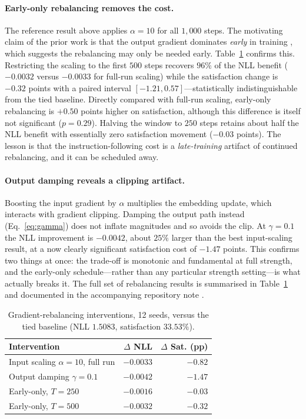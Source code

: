 \documentclass[conference]{IEEEtran}
\begin{document}
\paragraph{Early-only rebalancing removes the cost.}
The reference result above applies $\alpha=10$ for all $1{,}000$ steps. The
motivating claim of the prior work is that the output gradient dominates
\emph{early} in training \cite{lopardo}, which suggests the rebalancing may only
be needed early. Table~\ref{tab:scaling} confirms this. Restricting the scaling
to the first $500$ steps recovers $96\%$ of the NLL benefit ($-0.0032$ versus
$-0.0033$ for full-run scaling) while the satisfaction change is $-0.32$ points
with a paired interval $[-1.21,0.57]$---statistically indistinguishable from the
tied baseline. Directly compared with full-run scaling, early-only rebalancing
is $+0.50$ points higher on satisfaction, although this difference is itself not
significant ($p=0.29$). Halving the window to $250$ steps retains about half the
NLL benefit with essentially zero satisfaction movement ($-0.03$ points). The
lesson is that the instruction-following cost is a \emph{late-training} artifact
of continued rebalancing, and it can be scheduled away.

\paragraph{Output damping reveals a clipping artifact.}
Boosting the input gradient by $\alpha$ multiplies the embedding update, which
interacts with gradient clipping. Damping the output path instead
(Eq.~\ref{eq:gamma}) does not inflate magnitudes and so avoids the clip. At
$\gamma=0.1$ the NLL improvement is $-0.0042$, about $25\%$ larger than the
best input-scaling result, at a now clearly significant satisfaction cost of
$-1.47$ points. This confirms two things at once: the trade-off is monotonic and
fundamental at full strength, and the early-only schedule---rather than any
particular strength setting---is what actually breaks it. The full set of
rebalancing results is summarised in Table~\ref{tab:scaling} and documented in
the accompanying repository note \cite{followup}.

\begin{table}[t]
\caption{Gradient-rebalancing interventions, 12 seeds, versus the tied
baseline (NLL $1.5083$, satisfaction $33.53\%$).}
\label{tab:scaling}
\centering
\small
\begin{tabular}{lrr}
\toprule
Intervention & $\Delta$ NLL & $\Delta$ Sat. (pp) \\
\midrule
Input scaling $\alpha{=}10$, full run & $-0.0033$ & $-0.82$ \\
Output damping $\gamma{=}0.1$ & $\mathbf{-0.0042}$ & $-1.47$ \\
Early-only, $T{=}250$ & $-0.0016$ & $-0.03$ \\
Early-only, $T{=}500$ & $-0.0032$ & $-0.32$ \\
\bottomrule
\end{tabular}
\end{table}
\end{document}
